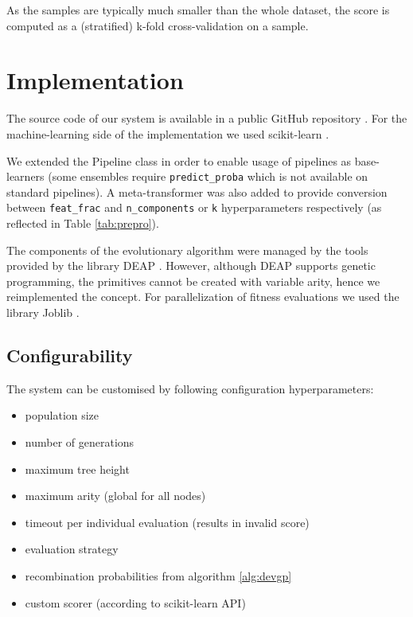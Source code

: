 As the samples are typically much smaller than the whole dataset, the score
is computed as a (stratified) k-fold cross-validation on a sample.
\section{Implementation}
The source code of our system is available in a public GitHub repository
\citep{git_genens}.
For the machine-learning side of the implementation we used scikit-learn
\citep{scikit-learn}.

We extended the Pipeline class in order to enable usage
of pipelines as base-learners (some ensembles require \texttt{predict\_proba}
which is not available on standard pipelines). A meta-transformer was also
added to provide conversion between \texttt{feat\_frac} and 
\texttt{n\_components} or \texttt{k} hyperparameters respectively (as reflected
in Table \ref{tab:prepro}).

The components of the evolutionary algorithm were managed by the tools provided by
the library DEAP \citep{DEAP_JMLR2012}. However, although DEAP supports genetic
programming, the primitives cannot be created with variable arity, hence we
reimplemented the concept.
For parallelization of fitness evaluations we used the library Joblib
\citep{joblib}.


\subsection{Configurability}
The system can be customised by following configuration hyperparameters:

\begin{itemize}
\item population size
\item number of generations
\item maximum tree height
\item maximum arity (global for all nodes)
\item timeout per individual evaluation (results in invalid score)
\item evaluation strategy
\item recombination probabilities from algorithm \ref{alg:devgp}
\item custom scorer (according to scikit-learn API)
\end{itemize}




